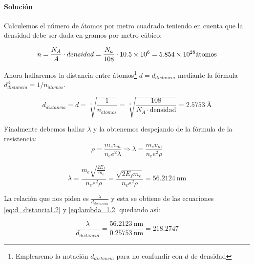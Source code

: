 \documentclass[12pt, a4paper]{article}
\begin{document}
        \paragraph{\textbf{Solución}}
        \paragraph{} Calculemos el número de átomos por metro cuadrado teniendo en cuenta que la densidad
        debe ser dada en gramos por metro cúbico:

        \begin{equation*}
            n = \frac{N_A}{A}\cdot densidad = \frac{N_a}{108}\cdot\num{10.5d6} = \num{5.854d28} \mbox{átomos}
        \end{equation*}

        Ahora hallaremos la distancia entre átomos\footnote{Emplearemo la
        notación $d_{distancia}$ para no confundir con $d$ de densidad} $d = d_{distancia}$
        mediante la fórmula $d_{distancia}^3 = 1/n_{\acute{a}tomos}$.

        \begin{equation}    \label{eq:d_distancia1.2}
            d_{distancia} = d = \sqrt[3]{\frac{1}{n_{\acute{a}tomos}}} = \sqrt[3]{\frac{108}{N_A\cdot \mbox{densidad}}}
            = \SI{2.5753}{\angstrom}
        \end{equation}

        Finalmente debemos hallar $\lambda$ y la obtenemos despejando de la fórmula de la resistencia:
        $$\rho = \frac{m_e v_m}{n_e e^2 \lambda} \Rightarrow \lambda = \frac{m_e v_m}{n_e e^2 \rho}$$

        \begin{equation}    \label{eq:lambda_1.2}
            \lambda = \frac{m_e\sqrt{\frac{2E_f}{m_e}}}{n_e e^2 \rho} = \frac{\sqrt{2 E_f m_e}}{n_e e^2 \rho}
            = \SI{56.2124}{\nano\meter}
        \end{equation}

        La relación que nos piden es $\frac{\lambda}{d_{distancia}}$ y esta se obtiene de las ecuaciones
        \ref{eq:d_distancia1.2} y \ref{eq:lambda_1.2} quedando así:

        \begin{equation*}
            \frac{\lambda}{d_{distancia}} = \frac{\SI{56.2123}{\nano\meter}}{\SI{0.25753}{\nano\meter}}
            = \num{218.2747}
        \end{equation*}
\end{document}

